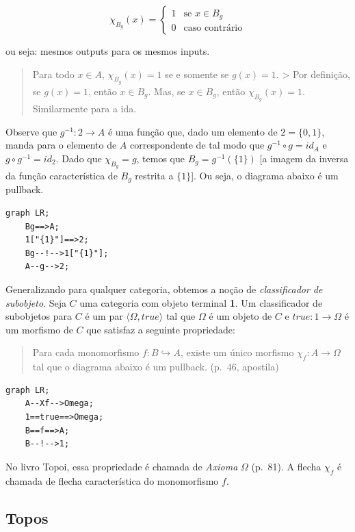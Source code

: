 \[
  \chi_{B_g}(x) =
  \begin{cases}
    1 & \text{se $x \in B_g$} \\
    0 & \text{caso contrário}
  \end{cases}
\]

ou seja: mesmos outputs para os mesmos inputs.

\begin{quote}
Para todo \(x \in A\), \(\chi_{B_g}(x) = 1\) se e somente se
\(g(x) = 1\). \textgreater{} Por definição, se \(g(x) = 1\), então
\(x \in B_g\). Mas, se \(x \in B_g\), então \(\chi_{B_g}(x) = 1\).
Similarmente para a ida.
\end{quote}

Observe que \(g^{-1} : 2 \rightarrow A\) é uma função que, dado um
elemento de \(2 = \{0,1\}\), manda para o elemento de \(A\)
correspondente de tal modo que \(g^{-1} \circ g = id_A\) e
\(g \circ g^{-1} = id_2\). Dado que \(\chi_{B_g} = g\), temos que
\(B_g = g^{-1}(\{1\})\) {[}a imagem da inversa da função característica
de \(B_g\) restrita a \(\{ 1 \}\){]}. Ou seja, o diagrama abaixo é um
pullback.

\begin{verbatim}
graph LR;
    Bg==>A;
    1["{1}"]==>2;
    Bg--!-->1["{1}"];
    A--g-->2;
\end{verbatim}

Generalizando para qualquer categoria, obtemos a noção de
\emph{classificador de subobjeto}. Seja \(C\) uma categoria com objeto
terminal \textbf{1}. Um classificador de subobjetos para \(C\) é um par
\(\langle \Omega, true \rangle\) tal que \(\Omega\) é um objeto de \(C\)
e \(true : 1 \rightarrow \Omega\) é um morfismo de \(C\) que satisfaz a
seguinte propriedade:

\begin{quote}
Para cada monomorfismo \(f : B \hookrightarrow A\), existe um único
morfismo \(\chi_f : A \rightarrow \Omega\) tal que o diagrama abaixo é
um pullback. (p.~46, apostila)
\end{quote}

\begin{verbatim}
graph LR;
    A--Xf-->Omega;
    1==true==>Omega;
    B==f==>A;
    B--!-->1;
\end{verbatim}

No livro Topoi, essa propriedade é chamada de \emph{Axioma} \(\Omega\)
(p.~81). A flecha \(\chi_f\) é chamada de flecha característica do
monomorfismo \(f\).

\hypertarget{topos}{%
\subsection{Topos}\label{topos}}

